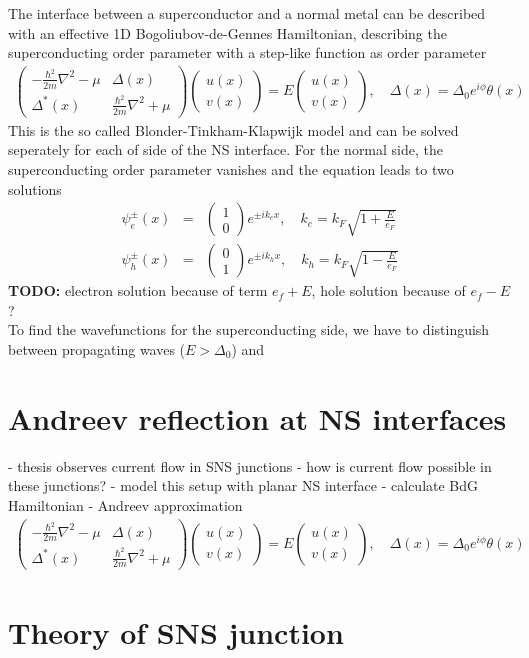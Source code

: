 The interface between a superconductor and a normal metal can be described with an effective 1D Bogoliubov-de-Gennes Hamiltonian, describing the superconducting order parameter with a step-like function as order parameter
\begin{eqnarray}
\begin{pmatrix}
-\frac{\hbar^2}{2m} \nabla^2 - \mu & \Delta(x) \\
\Delta^*(x) & \frac{\hbar^2}{2m} \nabla^2 + \mu
\end{pmatrix}
\begin{pmatrix}
u(x) \\
v(x)
\end{pmatrix} = E 
\begin{pmatrix}
u(x)\\
v(x)
\end{pmatrix}, \quad \Delta(x) = \Delta_0 e^{i \phi} \theta(x)
\end{eqnarray}
This is the so called Blonder-Tinkham-Klapwijk model and can be solved seperately for each of side of the NS interface. For the normal side, the superconducting order parameter vanishes and the equation leads to two solutions
\begin{eqnarray}
\psi_e^{\pm}(x) &=& \begin{pmatrix} 1 \\ 0 \end{pmatrix} e^{\pm i k_e x}, \quad k_e = k_F \sqrt{1 + \frac{E}{e_F}}\\ 
\psi_h^{\pm}(x) &=& \begin{pmatrix} 0 \\ 1 \end{pmatrix} e^{\pm i k_h x}, \quad k_h =  k_F \sqrt{1 - \frac{E}{e_F}}
\end{eqnarray}
\textbf{TODO:} electron solution because of term $e_f + E$, hole solution because of $e_f - E$ ? \\
To find the wavefunctions for the superconducting side, we have to distinguish between propagating waves ($E > \Delta_0$) and 

\section{Andreev reflection at NS interfaces}

- thesis observes current flow in SNS junctions
- how is current flow possible in these junctions?
- model this setup with planar NS interface
- calculate BdG Hamiltonian
- Andreev approximation
\begin{eqnarray}
\begin{pmatrix}
-\frac{\hbar^2}{2m} \nabla^2 - \mu & \Delta(x) \\
\Delta^*(x) & \frac{\hbar^2}{2m} \nabla^2 + \mu
\end{pmatrix}
\begin{pmatrix}
u(x) \\
v(x)
\end{pmatrix} = E 
\begin{pmatrix}
u(x)\\
v(x)
\end{pmatrix}, \quad \Delta(x) = \Delta_0 e^{i \phi} \theta(x)
\end{eqnarray}
\section{Theory of SNS junction}
